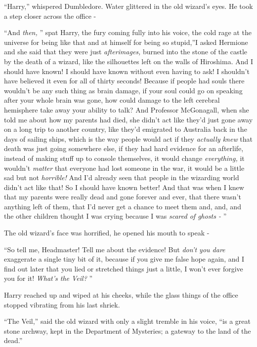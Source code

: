 ``Harry,'' whispered Dumbledore. Water glittered in the old wizard's
eyes. He took a step closer across the office -

``And \emph{then,} '' spat Harry, the fury coming fully into his voice,
the cold rage at the universe for being like that and at himself for
being so stupid,''I asked Hermione and she said that they were just
\emph{afterimages,} burned into the stone of the castle by the death of
a wizard, like the silhouettes left on the walls of Hiroshima. And I
should have known! I should have known without even having to ask! I
shouldn't have believed it even for all of thirty seconds! Because if
people had souls there wouldn't be any such thing as brain damage, if
your soul could go on speaking after your whole brain was gone, how
could damage to the left cerebral hemisphere take away your ability to
talk? And Professor McGonagall, when she told me about how my parents
had died, she didn't act like they'd just gone away on a long trip to
another country, like they'd emigrated to Australia back in the days of
sailing ships, which is the way people would act if they \emph{actually
knew} that death was just going somewhere else, if they had hard
evidence for an afterlife, instead of making stuff up to console
themselves, it would change \emph{everything,} it wouldn't \emph{matter}
that everyone had lost someone in the war, it would be a little sad but
not \emph{horrible!} And I'd already seen that people in the wizarding
world didn't act like that! So I should have known better! And that was
when I knew that my parents were really dead and gone forever and ever,
that there wasn't anything left of them, that I'd never get a chance to
meet them and, and, and the other children thought I was crying because
I was \emph{scared of ghosts -} ''

The old wizard's face was horrified, he opened his mouth to speak -

``So tell me, Headmaster! Tell me about the evidence! But \emph{don't you
dare} exaggerate a single tiny bit of it, because if you give me false
hope again, and I find out later that you lied or stretched things just
a little, I won't ever forgive you for it! \emph{What's the Veil?} ''

Harry reached up and wiped at his cheeks, while the glass things of the
office stopped vibrating from his last shriek.

``The Veil,'' said the old wizard with only a slight tremble in his
voice, ``is a great stone archway, kept in the Department of Mysteries;
a gateway to the land of the dead.''

